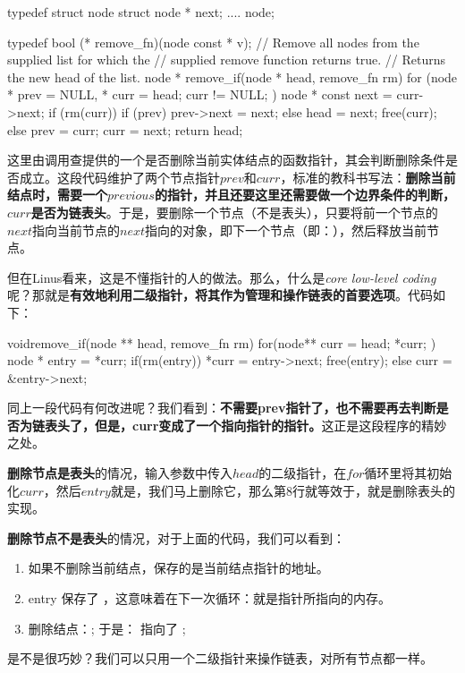 \begin{Code}
typedef struct node
{
    struct node * next;
    ....
} node;

typedef bool (* remove_fn)(node const * v);
// Remove all nodes from the supplied list for which the 
// supplied remove function returns true.
// Returns the new head of the list.
node * remove_if(node * head, remove_fn rm)
{
    for (node * prev = NULL, * curr = head; curr != NULL; )  {
        node * const next = curr->next;
        if (rm(curr))  {
            if (prev)
            prev->next = next;
            else
            head = next;
            free(curr);
        }
        else
        prev = curr;
        curr = next;
    }
    return head;
}
\end{Code}
这里由调用查提供的一个是否删除当前实体结点的函数指针，其会判断删除条件是否成立。这段代码维护了两个节点指针$prev$和$curr$，标准的教科书写法：\textbf{删除当前结点时，需要一个$previous$的指针，并且还要这里还需要做一个边界条件的判断，$curr$是否为链表头}。于是，要删除一个节点（不是表头），只要将前一个节点的$next$指向当前节点的$next$指向的对象，即下一个节点（即：），然后释放当前节点。

但在Linus看来，这是不懂指针的人的做法。那么，什么是\textit{core low-level coding}呢？那就是\textbf{有效地利用二级指针，将其作为管理和操作链表的首要选项}。代码如下：
\begin{Code}
voidremove_if(node ** head, remove_fn rm)
{
    for(node** curr = head; *curr; )
    {
        node * entry = *curr;
        if(rm(entry))
        {
            *curr = entry->next;
            free(entry);
        }
        else
        curr = &entry->next;
    }
}
\end{Code}
同上一段代码有何改进呢？我们看到：\textbf{不需要prev指针了，也不需要再去判断是否为链表头了，但是，curr变成了一个指向指针的指针。}这正是这段程序的精妙之处。
\begindot
\item \textbf{删除节点是表头}的情况，输入参数中传入$head$的二级指针，在$for$循环里将其初始化$curr$，然后$entry$就是，我们马上删除它，那么第8行就等效于，就是删除表头的实现。
\item \textbf{删除节点不是表头}的情况，对于上面的代码，我们可以看到：
    \begin{enumerate}
        \item 如果不删除当前结点，保存的是当前结点指针的地址。
        \item entry 保存了 ，这意味着在下一次循环：就是指针所指向的内存。
        \item 删除结点：; 于是： 指向了 ;
    \end{enumerate}
\myenddot
是不是很巧妙？我们可以只用一个二级指针来操作链表，对所有节点都一样。

